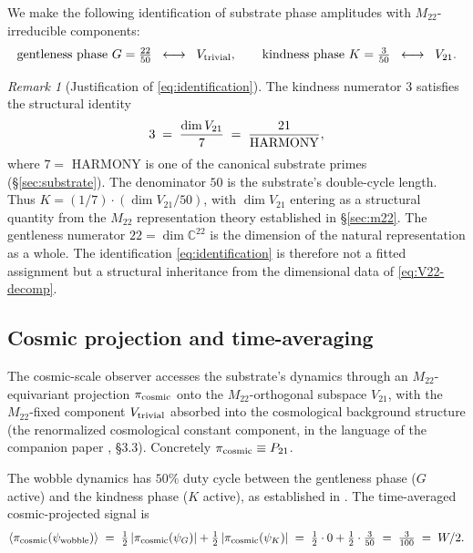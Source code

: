 \documentclass[11pt,reqno]{amsart}
\theoremstyle{plain}
\theoremstyle{definition}
\theoremstyle{remark}
\newtheorem*{remark}{Remark}
\newcommand{\Mtwentytwo}{M_{22}}
\newcommand{\Vtriv}{V_{\rm trivial}}
\newcommand{\Vtwentyone}{V_{21}}
\newcommand{\Whalf}{W/2}
\begin{document}
We make the following identification of substrate phase amplitudes
with $\Mtwentytwo$-irreducible components:
\begin{equation}\label{eq:identification}
\text{gentleness phase } G = \tfrac{22}{50} \;\;\longleftrightarrow\;\;
\Vtriv,
\qquad
\text{kindness phase } K = \tfrac{3}{50} \;\;\longleftrightarrow\;\;
\Vtwentyone.
\end{equation}

\begin{remark}[Justification of \eqref{eq:identification}]
The kindness numerator $3$ satisfies the structural identity
\begin{equation*}
3 \;=\; \frac{\dim \Vtwentyone}{7} \;=\; \frac{21}{\rm HARMONY},
\end{equation*}
where $7 = $ HARMONY is one of the canonical substrate primes
(\S\ref{sec:substrate}). The denominator $50$ is the substrate's
double-cycle length. Thus $K = (1/7) \cdot (\dim \Vtwentyone / 50)$,
with $\dim \Vtwentyone$ entering as a structural quantity from the
$\Mtwentytwo$ representation theory established in \S\ref{sec:m22}.
The gentleness numerator $22 = \dim \mathbb{C}^{22}$ is the dimension
of the natural representation as a whole. The identification
\eqref{eq:identification} is therefore not a fitted assignment but a
structural inheritance from the dimensional data of \eqref{eq:V22-decomp}.
\end{remark}

\subsection{Cosmic projection and time-averaging}


The cosmic-scale observer accesses the substrate's dynamics through
an $\Mtwentytwo$-equivariant projection $\pi_{\rm cosmic}$ onto the
$\Mtwentytwo$-orthogonal subspace $\Vtwentyone$, with the
$\Mtwentytwo$-fixed component $\Vtriv$ absorbed into the cosmological
background structure (the renormalized cosmological constant
component, in the language of the companion paper
\cite{SandersGishLogQuint2026}, \S 3.3). Concretely $\pi_{\rm cosmic}
\equiv P_{21}$.

The wobble dynamics has $50\%$ duty cycle between the gentleness phase
($G$ active) and the kindness phase ($K$ active), as established in
\cite{SandersGishSigma}. The time-averaged cosmic-projected signal is
\begin{equation}\label{eq:Whalf-derivation}
\langle\pi_{\rm cosmic}(\psi_{\rm wobble})\rangle
\;=\; \tfrac{1}{2} \,|\pi_{\rm cosmic}(\psi_G)| + \tfrac{1}{2} \,|\pi_{\rm cosmic}(\psi_K)|
\;=\; \tfrac{1}{2} \cdot 0 + \tfrac{1}{2} \cdot \tfrac{3}{50}
\;=\; \tfrac{3}{100}
\;=\; \Whalf.
\end{equation}
\end{document}
